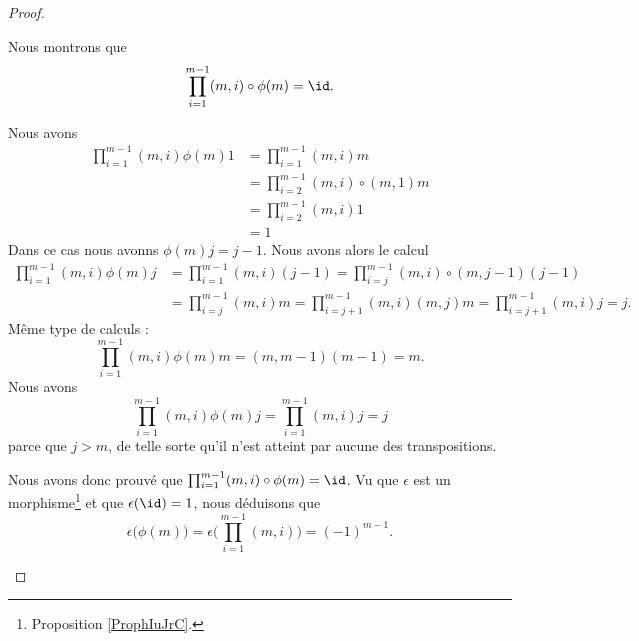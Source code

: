 \begin{proof}
\begin{subproof}
		Nous montrons que
		\begin{equation}
			\prod_{i=1}^{m-1}(m,i)\circ\phi(m)=\id.
		\end{equation}
		\begin{subproof}
			\spitem[Pour \( j=1\)]
			Nous avons
			\begin{subequations}
				\begin{align}
					\prod_{i=1}^{m-1}(m,i)\phi(m)1 & =\prod_{i=1}^{m-1}(m,i)m           \\
					                               & =\prod_{i=2}^{m-1}(m,i)\circ(m,1)m \\
					                               & =\prod_{i=2}^{m-1}(m,i)1           \\
					                               & =1
				\end{align}
			\end{subequations}
			\spitem[Si \( j\leq m-1\)]
			Dans ce cas nous avonns \( \phi(m)j=j-1\). Nous avons alors le calcul
			\begin{subequations}
				\begin{align}
					\prod_{i=1}^{m-1}(m,i)\phi(m)j & =\prod_{i=1}^{m-1}(m,i)(j-1) =\prod_{i=j}^{m-1}(m,i)\circ(m,j-1)(j-1)                   \\
					                               & =\prod_{i=j}^{m-1}(m,i)m =\prod_{i=j+1}^{m-1}(m,i)(m,j)m =\prod_{i=j+1}^{m-1}(m,i)j =j.
				\end{align}
			\end{subequations}
			\spitem[Pour \( j=m\)]
			Même type de calculs :
			\begin{equation}
				\prod_{i=1}^{m-1}(m,i)\phi(m)m
				=(m,m-1)(m-1)
				=m.
			\end{equation}
			\spitem[Pour \( j>m\)]
			Nous avons
			\begin{equation}
				\prod_{i=1}^{m-1}(m,i)\phi(m)j=\prod_{i=1}^{m-1}(m,i)j=j
			\end{equation}
			parce que \( j>m\), de telle sorte qu'il n'est atteint par aucune des transpositions.
		\end{subproof}
		Nous avons donc prouvé que $\prod_{i=1}^{m-1}(m,i)\circ\phi(m)=\id$. Vu que \( \epsilon\) est un morphisme\footnote{Proposition \ref{ProphIuJrC}.} et que \( \epsilon(\id)=1\), nous déduisons que
		\begin{equation}
			\epsilon\big( \phi(m) \big)=\epsilon\Big( \prod_{i=1}^{m-1}(m,i) \Big)=(-1)^{m-1}.
		\end{equation}


\end{subproof}
\end{proof}
